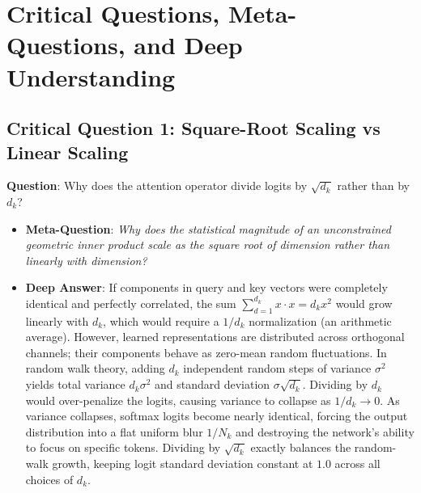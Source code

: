 \documentclass[11pt,a4paper]{article}
\theoremstyle{definition}
\begin{document}
\section{Critical Questions, Meta-Questions, and Deep Understanding}

\subsection{\textbf{Critical Question 1: Square-Root Scaling vs Linear Scaling}}
\textbf{Question}: Why does the attention operator divide logits by $\sqrt{d_k}$ rather than by $d_k$?
\begin{itemize}
    \item \textbf{Meta-Question}: \emph{Why does the statistical magnitude of an unconstrained geometric inner product scale as the square root of dimension rather than linearly with dimension?}
    \item \textbf{Deep Answer}: If components in query and key vectors were completely identical and perfectly correlated, the sum $\sum_{d=1}^{d_k} x \cdot x = d_k x^2$ would grow linearly with $d_k$, which would require a $1/d_k$ normalization (an arithmetic average). However, learned representations are distributed across orthogonal channels; their components behave as zero-mean random fluctuations. In random walk theory, adding $d_k$ independent random steps of variance $\sigma^2$ yields total variance $d_k \sigma^2$ and standard deviation $\sigma \sqrt{d_k}$. Dividing by $d_k$ would over-penalize the logits, causing variance to collapse as $1/d_k \to 0$. As variance collapses, softmax logits become nearly identical, forcing the output distribution into a flat uniform blur $1/N_k$ and destroying the network's ability to focus on specific tokens. Dividing by $\sqrt{d_k}$ exactly balances the random-walk growth, keeping logit standard deviation constant at $1.0$ across all choices of $d_k$.
\end{itemize}
\end{document}
